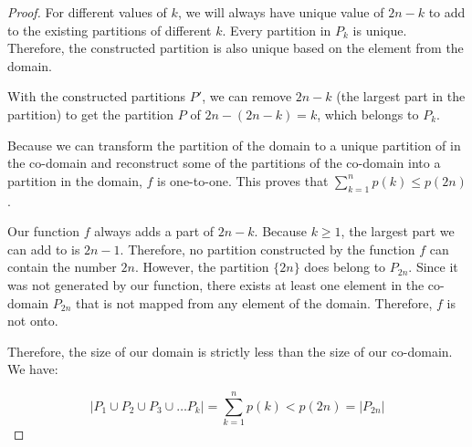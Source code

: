 \documentclass[10pt]{article}
\newcommand{\ds}{\displaystyle}
\begin{document}
\begin{enumerate}
\begin{enumerate}
\begin{proof}
    For different values of $k$, we will always have unique value of $2n-k$ to add to the existing partitions of different $k$. Every partition in $P_k$ is unique. Therefore, the constructed partition is also unique based on the element from the domain. 

    With the constructed partitions $P'$, we can remove $2n-k$ (the largest part in the partition) to get the partition $P$ of $2n - (2n-k) = k$, which belongs to $P_k$.

    Because we can transform the partition of the domain to a unique partition of in the co-domain and reconstruct some of the partitions of the co-domain into a partition in the domain, $f$ is one-to-one. This proves that $\sum_{k=1}^{n}p(k) \leq p(2n)$.

    Our function $f$ always adds a part of $2n - k$. Because $k \geq 1$, the largest part we can add to is $2n - 1$. Therefore, no partition constructed by the function $f$ can  contain the number $2n$. However, the partition $\{2n\}$ does belong to $P_{2n}$. Since it was not generated by our function, there exists at least one element in the co-domain $P_{2n}$ that is not mapped from any element of the domain. Therefore, $f$ is not onto. 
    
    Therefore, the size of our domain is strictly less than the size of our co-domain. We have:

    $$|P_1 \cup P_2\cup P_3 \cup \ldots P_k| = \ds\sum_{k=1}^{n}p(k) < p(2n) = |P_{2n}|$$
    
\end{proof}
\end{enumerate}

\end{enumerate}
\end{document}
